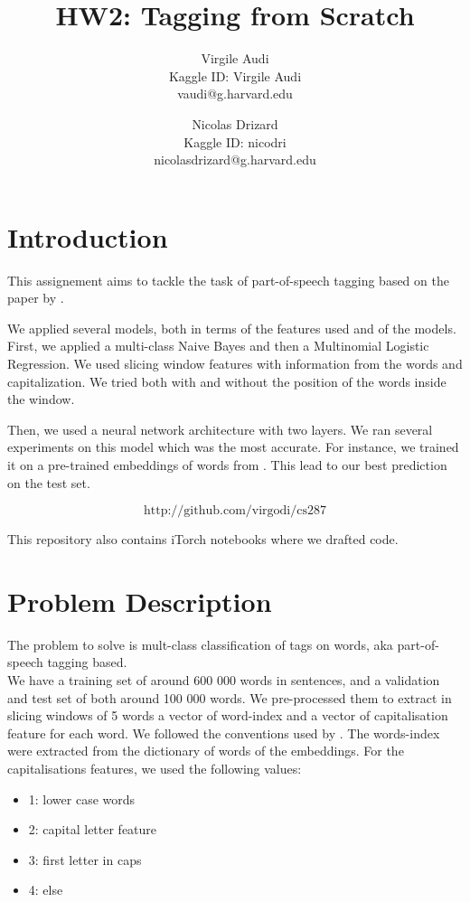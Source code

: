 \documentclass[11pt]{article}
\title{HW2: Tagging from Scratch}
\author{Virgile Audi \\ Kaggle ID: Virgile Audi \\ vaudi@g.harvard.edu \and Nicolas Drizard \\ Kaggle ID: nicodri \\ nicolasdrizard@g.harvard.edu }
\begin{document}
\maketitle{}
\section{Introduction}

This assignement aims to tackle the task of part-of-speech tagging based on the paper by \cite{Collobert}.

We applied several models, both in terms of the features used and of the models. First, we applied a multi-class Naive Bayes and then a Multinomial Logistic Regression. We used slicing window features with information from the words and capitalization. We tried both with and without the position of the words inside the window.

Then, we used a neural network architecture with two layers. We ran several experiments on this model which was the most accurate. For instance, we trained it on a pre-trained embeddings of words from \cite{pennington}. This lead to our best prediction on the test set.

$$\text{http://github.com/virgodi/cs287}$$

This repository also contains iTorch notebooks where we drafted code.


\section{Problem Description}

The problem to solve is mult-class classification of tags on words, aka part-of-speech tagging based.\\


We have a training set of around 600 000 words in sentences, and a validation and test set of both around 100 000 words. We pre-processed them to extract in slicing windows of 5 words a vector of word-index and a vector of capitalisation feature for each word. We followed the conventions used by \cite{Collobert}. The words-index were extracted from the dictionary of words of the embeddings. For the capitalisations features, we used the following values:
\begin{itemize}
\item 1: lower case words
\item 2: capital letter feature
\item 3: first letter in caps
\item 4: else
\end{itemize}
\end{document}
